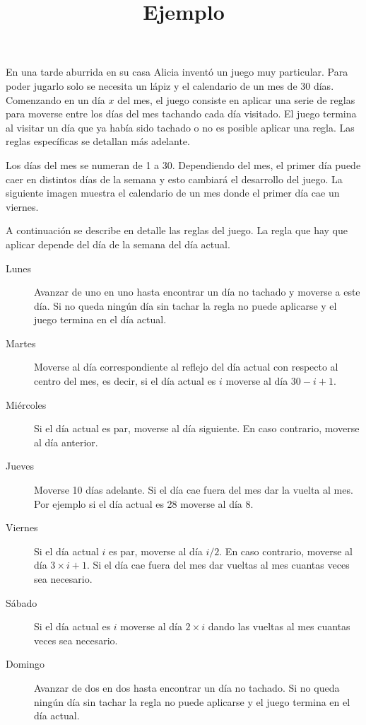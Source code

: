 \documentclass{oci}
\title{Ejemplo}
\begin{document}
\begin{problemDescription}
  En una tarde aburrida en su casa Alicia inventó un juego muy particular.
  Para poder jugarlo solo se necesita un lápiz y el calendario de un mes de 30 días.
  Comenzando en un día $x$ del mes, el juego consiste en aplicar una serie de reglas para
  moverse entre los días del mes tachando cada día visitado.
  El juego termina al visitar un día que ya había sido tachado o no es posible aplicar
  una regla.
  Las reglas específicas se detallan más adelante.

  Los días del mes se numeran de 1 a 30.
  Dependiendo del mes, el primer día puede caer en distintos días de la semana y esto cambiará
  el desarrollo del juego.
  La siguiente imagen muestra el calendario de un mes donde el primer día cae un viernes.
  \begin{center}
  \end{center}

  A continuación se describe en detalle las reglas del juego.
  La regla que hay que aplicar depende del día de la semana del día actual.

  \begin{description}
    \item[Lunes] Avanzar de uno en uno hasta encontrar un día no tachado y moverse a este día.
    Si no queda ningún día sin tachar la regla no puede aplicarse y el juego termina en el día actual.
    \item[Martes] Moverse al día correspondiente al reflejo del día actual con respecto al centro
    del mes, es decir, si el día actual es $i$ moverse al día $30 - i + 1$.
    \item[Miércoles] Si el día actual es par, moverse al día siguiente. En caso contrario, moverse al día anterior.
    \item[Jueves] Moverse 10 días adelante.
    Si el día cae fuera del mes dar la vuelta al mes.
    Por ejemplo si el día actual es 28 moverse al día 8.
    \item[Viernes] Si el día actual $i$ es par, moverse al día $i/2$. En caso contrario, moverse al día $3\times i + 1$.
    Si el día cae fuera del mes dar vueltas al mes cuantas veces sea necesario.
    \item[Sábado] Si el día actual es $i$ moverse al día $2\times i$ dando las vueltas al mes cuantas veces sea necesario.
    \item[Domingo] Avanzar de dos en dos hasta encontrar un día no tachado.
    Si no queda ningún día sin tachar la regla no puede aplicarse y el juego termina en el día actual.
  \end{description}
\end{problemDescription}
\end{document}
